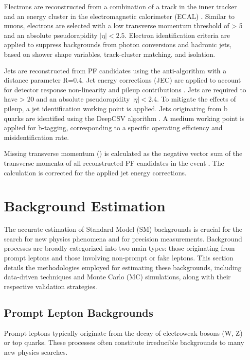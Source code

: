 Electrons are reconstructed from a combination of a track in the inner tracker and an energy cluster in the electromagnetic calorimeter (ECAL) \cite{CMS-PAS-EGM-10-004}. Similar to muons, electrons are selected with a low transverse momentum threshold of \pt > 5 \GeV and an absolute pseudorapidity $|\eta| < 2.5$. Electron identification criteria are applied to suppress backgrounds from photon conversions and hadronic jets, based on shower shape variables, track-cluster matching, and isolation.

Jets are reconstructed from PF candidates using the anti-\kt algorithm \cite{Cacciari:2008gp} with a distance parameter R=0.4. Jet energy corrections (JEC) are applied to account for detector response non-linearity and pileup contributions \cite{CMS-PAS-JME-10-003}. Jets are required to have \pt > 20 \GeV and an absolute pseudorapidity $|\eta| < 2.4$. To mitigate the effects of pileup, a jet identification working point is applied.
Jets originating from b quarks are identified using the DeepCSV algorithm \cite{CMS-PAS-BTV-18-001}. A medium working point is applied for b-tagging, corresponding to a specific operating efficiency and misidentification rate.

Missing transverse momentum (\ETmiss) is calculated as the negative vector sum of the transverse momenta of all reconstructed PF candidates in the event \cite{CMS-PAS-JME-10-004}. The \ETmiss calculation is corrected for the applied jet energy corrections.

\section{Background Estimation}
The accurate estimation of Standard Model (SM) backgrounds is crucial for the search for new physics phenomena and for precision measurements. Background processes are broadly categorized into two main types: those originating from prompt leptons and those involving non-prompt or fake leptons. This section details the methodologies employed for estimating these backgrounds, including data-driven techniques and Monte Carlo (MC) simulations, along with their respective validation strategies.

\subsection{Prompt Lepton Backgrounds}
Prompt leptons typically originate from the decay of electroweak bosons (W, Z) or top quarks. These processes often constitute irreducible backgrounds to many new physics searches.

